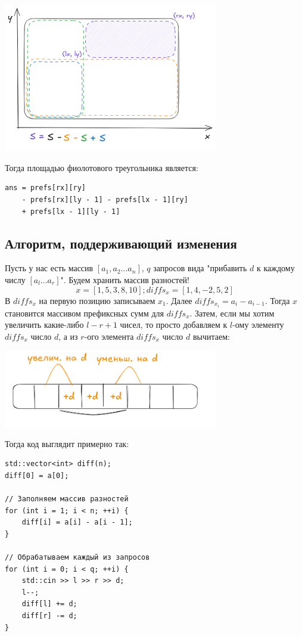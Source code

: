 \documentclass[a4paper,12pt]{article}
\begin{document}
\begin{center}
	\includegraphics[width=0.7\textwidth]{../assets/submatrixsum.png}
\end{center}

Тогда площадью фиолотового треугольника является: \begin{verbatim}
ans = prefs[rx][ry]
    - prefs[rx][ly - 1] - prefs[lx - 1][ry]
    + prefs[lx - 1][ly - 1]
\end{verbatim}

\subsection{Алгоритм, поддерживающий изменения}
Пусть у нас есть массив $[a_1, a_2 \dots a_n]$, $q$ запросов вида
"прибавить $d$ к каждому числу $[a_l \dots a_r]$".
Будем хранить массив разностей!
\[
	x = [1, 5, 3, 8, 10];
	diffs_x = [1, 4, -2, 5, 2]
\]
В $diffs_x$ на первую позицию записываем $x_1$.
Далее $diffs_{x_i} = a_i - a_{i-1}$.
Тогда $x$ становится массивом префиксных сумм для $diffs_x$.
Затем, если мы хотим увеличить какие-либо $l - r + 1$ чисел,
то просто добавляем к $l$-ому элементу $diffs_x$ число $d$, а из
$r$-ого элемента $diffs_x$ число $d$ вычитаем:
\begin{center}
	\includegraphics[width=0.7\textwidth]{../assets/diffarray.png}
\end{center}

Тогда код выглядит примерно так:

\begin{verbatim}
std::vector<int> diff(n);
diff[0] = a[0];

// Заполняем массив разностей
for (int i = 1; i < n; ++i) {
    diff[i] = a[i] - a[i - 1];
}

// Обрабатываем каждый из запросов
for (int i = 0; i < q; ++i) {
    std::cin >> l >> r >> d;
    l--;
    diff[l] += d;
    diff[r] -= d;
}
\end{verbatim}
\end{document}
